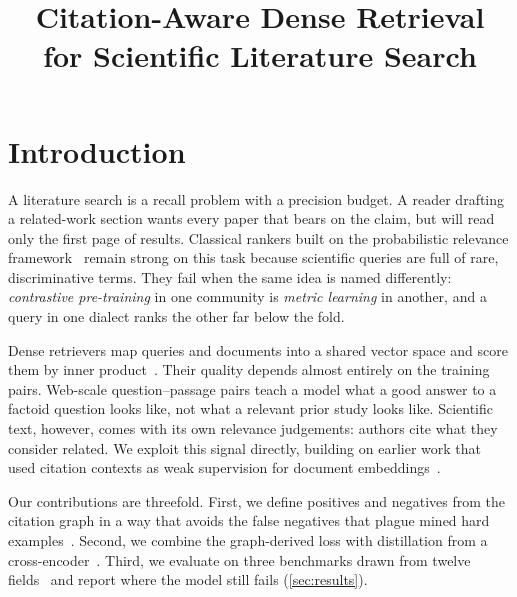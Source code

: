\documentclass[10pt, twoside]{article}
\title{Citation-Aware Dense Retrieval\\for Scientific Literature Search}
\begin{document}
\maketitle

\section{Introduction}
\label{sec:intro}

A literature search is a recall problem with a precision budget. A reader
drafting a related-work section wants every paper that bears on the claim, but
will read only the first page of results. Classical rankers built on the
probabilistic relevance framework~\cite{robertson2009bm25,manning2008ir}
remain strong on this task because scientific queries are full of rare,
discriminative terms. They fail when the same idea is named differently:
\emph{contrastive pre-training} in one community is \emph{metric learning} in
another, and a query in one dialect ranks the other far below the fold.

Dense retrievers map queries and documents into a shared vector space and
score them by inner product~\cite{halvorsen2021dual}. Their quality depends
almost entirely on the training pairs. Web-scale question--passage pairs teach
a model what a good answer to a factoid question looks like, not what a
relevant prior study looks like. Scientific text, however, comes with its own
relevance judgements: authors cite what they consider related. We exploit this
signal directly, building on earlier work that used citation contexts as weak
supervision for document embeddings~\cite{duval2020citation}.

Our contributions are threefold. First, we define positives and negatives
from the citation graph in a way that avoids the false negatives that plague
mined hard examples~\cite{oyelaran2022hardneg}. Second, we combine the
graph-derived loss with distillation from a cross-encoder~\cite{brennan2023distill}.
Third, we evaluate on three benchmarks drawn from twelve
fields~\cite{castellano2023scibench} and report where the model still fails
(\cref{sec:results}).
\end{document}
